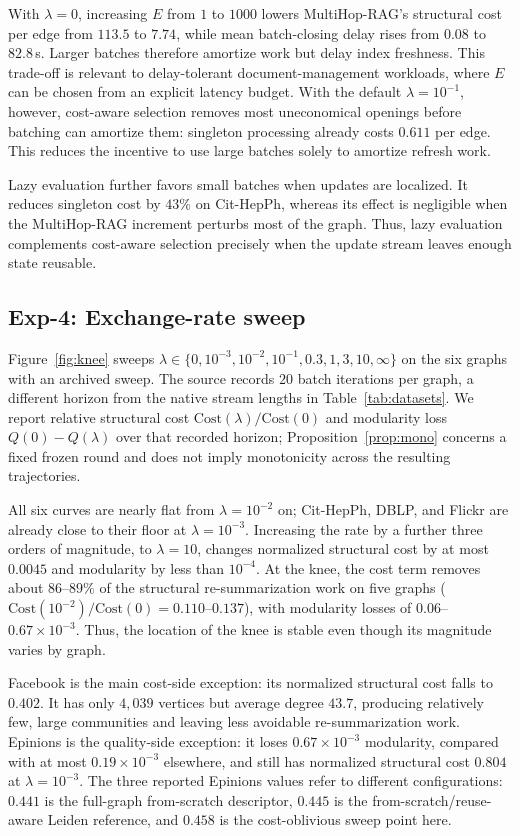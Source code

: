 With $\lambda=0$, increasing $E$ from $1$ to $1000$ lowers MultiHop-RAG's
structural cost per edge from $113.5$ to $7.74$, while mean batch-closing delay
rises from $0.08$ to $82.8$\,s. Larger batches therefore amortize work but delay
index freshness. This trade-off is relevant to
delay-tolerant document-management workloads, where $E$ can be chosen from an
explicit latency budget. With the default $\lambda=10^{-1}$, however, cost-aware
selection removes most uneconomical openings before batching can amortize them:
singleton processing already costs $0.611$ per edge. This reduces the
incentive to use large batches solely to amortize refresh work.

Lazy evaluation further favors small batches when updates are localized. It
reduces singleton cost by $43\%$ on Cit-HepPh, whereas its effect is negligible
when the MultiHop-RAG increment perturbs most of the graph. Thus, lazy evaluation
complements cost-aware selection precisely when the update stream leaves enough
state reusable.

\subsection{Exp-4: Exchange-rate sweep}
\label{app:exp4-detail}

Figure~\ref{fig:knee} sweeps
$\lambda \in \{0, 10^{-3}, 10^{-2}, 10^{-1}, 0.3, 1, 3, 10, \infty\}$ on the six
graphs with an archived sweep. The source records $20$ batch iterations
per graph, a different horizon from the native stream lengths in
Table~\ref{tab:datasets}. We report relative structural cost
$\mathrm{Cost}(\lambda)/\mathrm{Cost}(0)$ and modularity loss
$Q(0)-Q(\lambda)$ over that recorded horizon;
Proposition~\ref{prop:mono} concerns a fixed frozen round and does not imply
monotonicity across the resulting trajectories.

All six curves are nearly flat from $\lambda=10^{-2}$ on; Cit-HepPh, DBLP,
and Flickr are already close to their floor at $\lambda=10^{-3}$.
Increasing the rate by a further three orders of magnitude, to $\lambda=10$,
changes normalized structural cost by at most $0.0045$ and modularity by less than
$10^{-4}$. At the knee, the cost term removes about $86$--$89\%$ of the
structural re-summarization work on five graphs
($\mathrm{Cost}(10^{-2})/\mathrm{Cost}(0)=0.110$--$0.137$), with modularity
losses of $0.06$--$0.67\times10^{-3}$. Thus, the location of the knee is stable
even though its magnitude varies by graph.

Facebook is the main cost-side exception: its normalized structural cost falls to $0.402$.
It has only $4{,}039$ vertices but average degree $43.7$, producing relatively
few, large communities and leaving less avoidable re-summarization work.
Epinions is the quality-side exception: it loses $0.67\times10^{-3}$ modularity,
compared with at most $0.19\times10^{-3}$ elsewhere, and still has normalized
structural cost $0.804$ at $\lambda=10^{-3}$.
The three reported Epinions values refer to different configurations:
$0.441$ is the full-graph
from-scratch \Louvain{} descriptor, $0.445$ is the from-scratch/reuse-aware
Leiden reference, and $0.458$ is the cost-oblivious sweep point here.

